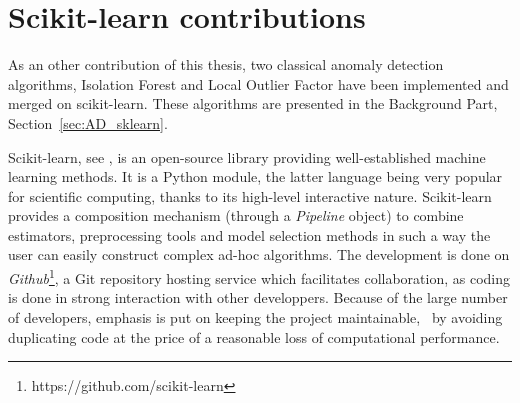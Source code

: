 

\section{Scikit-learn contributions}
\label{sec:impl}

As an other contribution of this thesis, two classical anomaly detection algorithms, Isolation Forest and Local Outlier Factor have been implemented and merged on scikit-learn. These algorithms are presented in the Background Part, Section~\ref{sec:AD_sklearn}. %

Scikit-learn, see \cite{sklearn2011}, is an open-source library providing well-established machine learning methods.
It is a Python module, the latter language being very popular for scientific computing, thanks to its high-level interactive nature. %
Scikit-learn provides a composition mechanism (through a \emph{Pipeline} object) to combine estimators, preprocessing tools and model selection methods in such a way the user can easily construct complex ad-hoc algorithms.
%
The development is done on \emph{Github}\footnote{https://github.com/scikit-learn}, a Git repository hosting service which facilitates collaboration, as coding is done in strong interaction with other developpers. Because of the large number of developers, emphasis is put on keeping the project maintainable, \eg~by avoiding duplicating code at the price of a reasonable loss of computational performance.%


